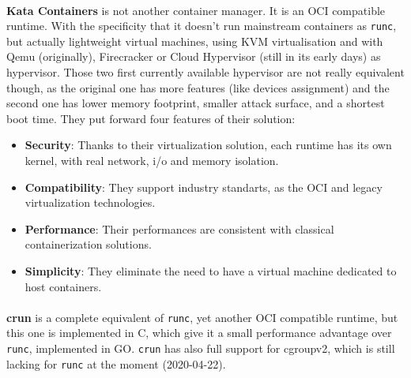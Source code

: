 \paragraph{}\textbf{Kata Containers} is not another container manager.  It is an OCI compatible runtime.  With the specificity that it doesn't run mainstream containers as \texttt{runc}, but actually lightweight virtual machines, using KVM virtualisation and with Qemu (originally), Firecracker or Cloud Hypervisor (still in its early days) as hypervisor.  Those two first currently available hypervisor are not really equivalent though, as the original one has more features (like devices assignment) and the second one has lower memory footprint, smaller attack surface, and a shortest boot time.
They put forward four features of their solution:
\begin{itemize}
\renewcommand\labelitemi{--}
  \item \textbf{Security}: Thanks to their virtualization solution, each runtime has its own kernel, with real network, i/o and memory isolation.
  \item \textbf{Compatibility}:  They support industry standarts, as the OCI\cite{oci} and legacy virtualization technologies.
  \item \textbf{Performance}:  Their performances are consistent with classical containerization solutions.
  \item \textbf{Simplicity}:  They eliminate the need to have a virtual machine dedicated to host containers.
\end{itemize}

\paragraph{}\textbf{crun} is a complete equivalent of \texttt{runc}, yet another OCI compatible runtime, but this one is implemented in C, which give it a small performance advantage over \texttt{runc}, implemented in GO.  \texttt{crun} has also full support for cgroupv2, which is still lacking for \texttt{runc} at the moment (2020-04-22).
